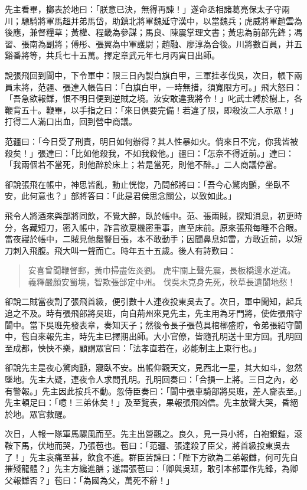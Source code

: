 先主看畢，擲表於地曰：「朕意已決，無得再諫！」遂命丞相諸葛亮保太子守兩川；驃騎將軍馬超并弟馬岱，助鎮北將軍魏延守漢中，以當魏兵；虎威將軍趙雲為後應，兼督糧草；黃權、程畿為參謀；馬良、陳震掌理文書；黃忠為前部先鋒；馮習、張南為副將；傅彤、張翼為中軍護尉；趙融、廖淳為合後。川將數百員，并五谿番將等，共兵七十五萬。擇定章武元年七月丙寅日出師。

說張飛回到閬中，下令軍中：限三日內製白旗白甲，三軍挂孝伐吳，次日，帳下兩員末將，范疆、張達入帳告曰：「白旗白甲，一時無措，須寬限方可。」飛大怒曰：「吾急欲報讎，恨不明日便到逆賊之境。汝安敢違我將令！」叱武士縛於樹上，各鞭背五十。鞭畢，以手指之曰：「來日俱要完備！若違了限，即殺汝二人示眾！」打得二人滿口出血，回到營中商議。

范疆曰：「今日受了刑責，明日如何辦得？其人性暴如火。倘來日不完，你我皆被殺矣！」張達曰：「比如他殺我，不如我殺他。」疆曰：「怎奈不得近前。」達曰：「我兩個若不當死，則他醉於床上；若是當死，則他不醉。」二人商議停當。

卻說張飛在帳中，神思皆亂，動止恍惚，乃問部將曰：「吾今心驚肉顫，坐臥不安，此何意也？」部將答曰：「此是君侯思念關公，以致如此。」

飛令人將酒來與部將同飲，不覺大醉，臥於帳中。范、張兩賊，探知消息，初更時分，各藏短刀，密入帳中，詐言欲稟機密重事，直至床前。原來張飛每睡不合眼。當夜寢於帳中，二賊見他鬚豎目張，本不敢動手；因聞鼻息如雷，方敢近前，以短刀刺入飛腹。飛大叫一聲而亡。時年五十五歲。後人有詩歎曰：

\begin{quote}
安喜曾聞鞭督郵，黃巾掃盡佐炎劉。
虎牢關上聲先震，長板橋邊水逆流。
義釋嚴顏安蜀境，智欺張邰定中州。
伐吳未克身先死，秋草長遺閬地愁！
\end{quote}

卻說二賊當夜割了張飛首級，便引數十人連夜投東吳去了。次日，軍中聞知，起兵追之不及。時有張飛部將吳班，向自荊州來見先主，先主用為牙門將，使佐張飛守閬中。當下吳班先發表章，奏知天子；然後令長子張苞具棺槨盛貯，令弟張紹守閬中，苞自來報先主，時先主已擇期出師。大小官僚，皆隨孔明送十里方回。孔明回至成都，怏怏不樂，顧謂眾官曰：「法孝直若在，必能制主上東行也。」

卻說先主是夜心驚肉顫，寢臥不安。出帳仰觀天文，見西北一星，其大如斗，忽然墜地。先主大疑，連夜令人求問孔明。孔明回奏曰：「合損一上將。三日之內，必有警報。」先主因此按兵不動。忽侍臣奏曰：「閬中張車騎部將吳班，差人齎表至。」先主頓足曰：「噫！三弟休矣！」及至覽表，果報張飛凶信。先主放聲大哭，昏絕於地。眾官救醒。

次日，人報一隊軍馬驟風而至。先主出營觀之。良久，見一員小將，白袍銀鎧，滾鞍下馬，伏地而哭，乃張苞也。苞曰：「范疆、張達殺了臣父，將首級投東吳去了！」先主哀痛至甚，飲食不進。群臣苦諫曰：「陛下方欲為二弟報讎，何可先自摧殘龍體？」先主方纔進膳；遂謂張苞曰：「卿與吳班，敢引本部軍作先鋒，為卿父報讎否？」苞曰：「為國為父，萬死不辭！」

